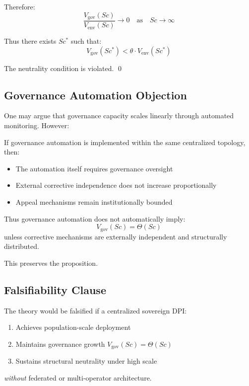 \documentclass{article}
\begin{document}
Therefore:
\begin{equation}
\frac{V_{\text{gov}}(Sc)}{V_{\text{env}}(Sc)} \to 0 \quad \text{as} \quad Sc \to \infty
\end{equation}

Thus there exists $Sc^*$ such that:
\begin{equation}
V_{\text{gov}}(Sc^*) < \theta \cdot V_{\text{env}}(Sc^*)
\end{equation}

The neutrality condition is violated. \qed

\subsection{Governance Automation Objection}

One may argue that governance capacity scales linearly through automated monitoring. However:

If governance automation is implemented within the same centralized topology, then:
\begin{itemize}[noitemsep]
    \item The automation itself requires governance oversight
    \item External corrective independence does not increase proportionally
    \item Appeal mechanisms remain institutionally bounded
\end{itemize}

Thus governance automation does not automatically imply:
\begin{equation}
V_{\text{gov}}(Sc) = \Theta(Sc)
\end{equation}
unless corrective mechanisms are externally independent and structurally distributed.

This preserves the proposition.

\subsection{Falsifiability Clause}

The theory would be falsified if a centralized sovereign DPI:
\begin{enumerate}[noitemsep]
    \item Achieves population-scale deployment
    \item Maintains governance growth $V_{\text{gov}}(Sc) = \Theta(Sc)$
    \item Sustains structural neutrality under high scale
\end{enumerate}
\textit{without} federated or multi-operator architecture.
\end{document}
